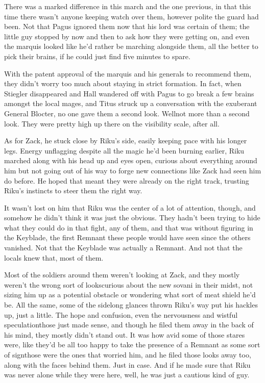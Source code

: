 There was a marked difference in this march and the one previous, in that this time there wasn't anyone keeping watch over them, however polite the guard had been. Not that Pagus ignored them now that his lord was certain of them; the little guy stopped by now and then to ask how they were getting on, and even the marquis looked like he'd rather be marching alongside them, all the better to pick their brains, if he could just find five minutes to spare.

With the patent approval of the marquis and his generals to recommend them, they didn't worry too much about staying in strict formation. In fact, when Stiegler disappeared and Hall wandered off with Pagus to go break a few brains amongst the local mages, and Titus struck up a conversation with the exuberant General Blocter, no one gave them a second look. Well\textemdash not more than a second look. They were pretty high up there on the visibility scale, after all.

As for Zack, he stuck close by Riku's side, easily keeping pace with his longer legs. Energy unflagging despite all the magic he'd been burning earlier, Riku marched along with his head up and eyes open, curious about everything around him but not going out of his way to forge new connections like Zack had seen him do before. He hoped that meant they were already on the right track, trusting Riku's instincts to steer them the right way.

It wasn't lost on him that Riku was the center of a lot of attention, though, and somehow he didn't think it was just the obvious. They hadn't been trying to hide what they could do in that fight, any of them, and that was without figuring in the Keyblade, the first Remnant these people would have seen since the others vanished. Not that the Keyblade was actually a Remnant. And not that the locals knew that, most of them.

Most of the soldiers around them weren't looking at Zack, and they mostly weren't the wrong sort of looks\textemdash curious about the new sovani in their midst, not sizing him up as a potential obstacle or wondering what sort of meat shield he'd be. All the same, some of the sidelong glances thrown Riku's way put his hackles up, just a little. The hope and confusion, even the nervousness and wistful speculation\textemdash those just made sense, and though he filed them away in the back of his mind, they mostly didn't stand out. It was how avid some of those stares were, like they'd be all too happy to take the presence of a Remnant as some sort of sign\textemdash those were the ones that worried him, and he filed those looks away too, along with the faces behind them. Just in case. And if he made sure that Riku was never alone while they were here, well, he was just a cautious kind of guy.

